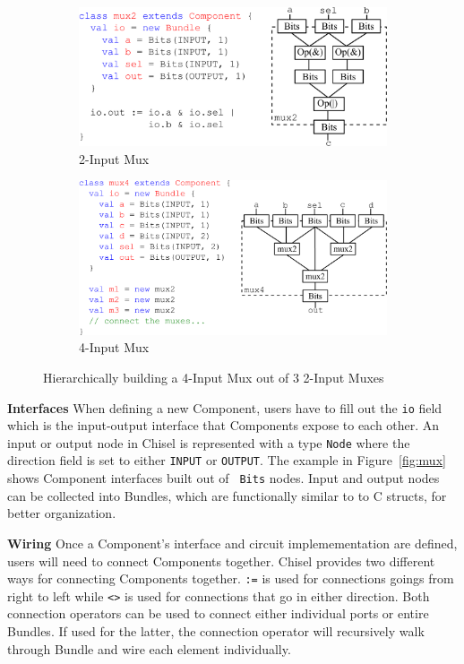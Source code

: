 \begin{figure}
\centering
  \begin{subfigure}[t]{0.48\textwidth}
  \centering
  \includegraphics[width=\textwidth]{figures/mux2.pdf}
  \caption{2-Input Mux}
  \label{fig:mux2}
  \end{subfigure}
  \hfill
  \begin{subfigure}[t]{0.48\textwidth}
  \centering
  \includegraphics[width=\textwidth]{figures/mux4.pdf}
  \caption{4-Input Mux}
  \label{fig:mux4}
  \end{subfigure}
  \caption{Hierarchically building a 4-Input Mux out of 3 2-Input Muxes}
  \label{fig:muxcomp}
\end{figure}

{\bf Interfaces} When defining a new Component, users have to fill out
the {\tt io} field which is the input-output interface that
Components expose to each other. An input or output node in Chisel is
represented with a type {\tt Node} where the direction field is set to
either {\tt INPUT} or {\tt OUTPUT}. The example in
Figure~\ref{fig:mux} shows Component interfaces built out of {\tt
Bits} nodes. Input and output nodes can be
collected into Bundles, which are functionally similar to to C
structs, for better organization. 

{\bf Wiring} Once a Component's interface and circuit
implemementation are defined, users will need to connect Components
together. Chisel provides two different ways for connecting
Components together. {\tt :=} is used for connections goings from
right to left while {\tt <>} is used for connections that go in either
direction. Both connection operators can be used to connect either individual
ports or entire Bundles. If used for the latter, the connection
operator will recursively walk through Bundle and wire each element
individually.

